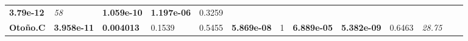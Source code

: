 \documentclass[]{book}
\theoremstyle{definition}
\theoremstyle{definition}
\theoremstyle{definition}
\theoremstyle{remark}
\begin{document}
\begin{longtable}[]{@{}lllllllllllll@{}}
\begin{minipage}[t]{0.05\columnwidth}
\textbf{3.79e-12}\strut
\end{minipage} & \begin{minipage}[t]{0.05\columnwidth}\raggedright
\emph{58}\strut
\end{minipage} & \begin{minipage}[t]{0.05\columnwidth}\raggedright
\textbf{1.059e-10}\strut
\end{minipage} & \begin{minipage}[t]{0.06\columnwidth}\raggedright
\textbf{1.197e-06}\strut
\end{minipage} & \begin{minipage}[t]{0.05\columnwidth}\raggedright
0.3259\strut
\end{minipage}\tabularnewline
\begin{minipage}[t]{0.06\columnwidth}\raggedright
\textbf{Otoño.C}\strut
\end{minipage} & \begin{minipage}[t]{0.05\columnwidth}\raggedright
\textbf{3.958e-11}\strut
\end{minipage} & \begin{minipage}[t]{0.05\columnwidth}\raggedright
\textbf{0.004013}\strut
\end{minipage} & \begin{minipage}[t]{0.06\columnwidth}\raggedright
0.1539\strut
\end{minipage} & \begin{minipage}[t]{0.05\columnwidth}\raggedright
0.5455\strut
\end{minipage} & \begin{minipage}[t]{0.05\columnwidth}\raggedright
\textbf{5.869e-08}\strut
\end{minipage} & \begin{minipage}[t]{0.05\columnwidth}\raggedright
1\strut
\end{minipage} & \begin{minipage}[t]{0.06\columnwidth}\raggedright
\textbf{6.889e-05}\strut
\end{minipage} & \begin{minipage}[t]{0.05\columnwidth}\raggedright
\textbf{5.382e-09}\strut
\end{minipage} & \begin{minipage}[t]{0.05\columnwidth}\raggedright
0.6463\strut
\end{minipage} & \begin{minipage}[t]{0.05\columnwidth}\raggedright
\emph{28.75}\strut
\end{minipage} & \begin{minipage}[t]{0.06\columnwidth}\raggedright

\end{minipage}
\end{longtable}
\end{document}
